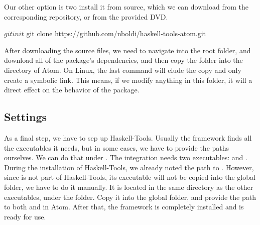 \documentclass[main.tex]{subfiles}
\begin{document}
	Our other option is two install it from source, which we can download from the corresponding repository, or from the provided DVD.
	
	\begin{bash}
		$ git init
		$ git clone https://github.com/nboldi/haskell-tools-atom.git
	\end{bash}
	
	After downloading the source files, we need to navigate into the root folder, and download all of the package's dependencies, and then copy the folder into the  directory of Atom. On Linux, the last command will elude the copy and only create a symbolic link. This means, if we modify anything in this folder, it will a direct effect on the behavior of the package.
	
	
	\subsection{Settings}
	
	As a final step, we have to sep up Haskell-Tools. Usually the framework finds all the executables it needs, but in some cases, we have to provide the paths ourselves. We can do that under . The integration needs two executables:  and . During the installation of Haskell-Tools, we already noted the path to . However, since  is not part of Haskell-Tools, its executable will not be copied into the global  folder, we have to do it manually. It is located in the same directory as the other executables, under the  folder. Copy it into the global  folder, and provide the path to both  and  in Atom. After that, the framework is completely installed and is ready for use.
	
\end{document}
